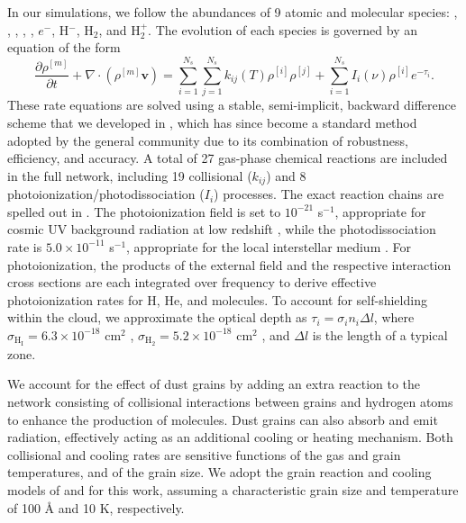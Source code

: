 \documentclass{aastex6}
\begin{document}
In our simulations, we follow the abundances of 9 atomic and molecular species: , , , , , $e^-$, H$^-$, H$_2$, and H$_2^+$. The evolution of each species is governed by an equation of the form
\begin{equation}
\frac{\partial \rho^{[m]}}{\partial t} +\nabla \cdot (\rho^{[m]} \mathbf{v})
        = {\sum_{i=1}^{N_{s}}}{\sum_{j=1}^{N_{s}}} 
                            {{k_{ij}(T)}{\rho^{[i]}}{\rho^{[j]}}}
            + \sum_{i=1}^{N_{s}} {I_i (\nu) \rho^{[i]}} e^{-\tau_i}.
\label{eqn:dens_m}
\end{equation}
These rate equations are solved using a stable, semi-implicit, backward difference scheme that we developed in \citet{Anninos97}, which has since become a standard method adopted by the general community \citep[e.g.][]{Smith16} due to its combination of robustness, efficiency, and accuracy.  A total of 27 gas-phase chemical reactions are included in the full network,  including 19 collisional ($k_{ij}$) and 8 photoionization/photodissociation ($I_i$) processes.  The exact reaction chains are spelled out in \citet{Anninos03}.  The photoionization field is set to $10^{-21}$ s$^{-1}$, appropriate for cosmic UV background radiation at low redshift \citep{Bechtold87}, while the photodissociation rate is $5.0 \times 10^{-11}$ s$^{-1}$, appropriate for the local interstellar medium \citep{Spaans97}. For photoionization, the products of the external field and the respective interaction cross sections are each integrated over frequency to derive effective photoionization rates for H, He, and molecules. To account for self-shielding within the cloud, we approximate the optical depth as $\tau_i = \sigma_i n_i \Delta l$, where $\sigma_{\mathrm{H}_\mathrm{I}} = 6.3 \times 10^{-18}$ cm$^2$ \citep{Osterbrock89}, $\sigma_{\mathrm{H}_2} = 5.2 \times 10^{-18}$ cm$^2$ \citep{Hollenbach71}, and $\Delta l$ is the length of a typical zone.

We account for the effect of dust grains by adding an extra reaction to the network consisting of collisional interactions between grains and hydrogen atoms to enhance the production of molecules. Dust grains can also absorb and emit radiation, effectively acting as an additional cooling or heating mechanism. Both collisional and cooling rates are sensitive functions of the gas and grain temperatures, and of the grain size.
We adopt the grain reaction and cooling models of \cite{Hollenbach79} and \cite{Omukai00} for this work, assuming a characteristic grain size and temperature of 100 {\AA} and 10 K, respectively.
\end{document}
